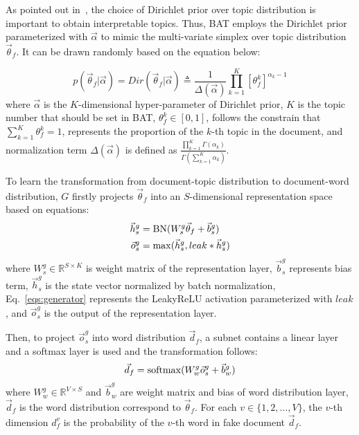\documentclass[11pt,a4paper]{article}
\begin{document}
As pointed out in~\cite{wallach2009rethinking}, the choice of Dirichlet prior over topic distribution is important to obtain interpretable topics. Thus, BAT employs the Dirichlet prior parameterized with $\vec \alpha$ to mimic the multi-variate simplex over topic distribution $\vec \theta_{f}$. It can be drawn randomly based on the equation below:
\begin{comment}
\begin{equation}
p(\vec \theta_{f}|\vec \alpha)=Dir(\vec \theta_{f}|\vec \alpha)\triangleq \frac{1}{\Delta(\vec \alpha)}\prod_{k=1}^{K}\left[\theta_{f}^{k}\right]^{\alpha_{k}-1}
\end{equation}
\end{comment}
\begin{equation}
p(\vec \theta_{f}|\vec \alpha)=Dir(\vec \theta_{f}|\vec \alpha)\triangleq \frac{1}{\Delta(\vec \alpha)}\prod_{k=1}^{K}\left[\theta_{f}^{k}\right]^{\alpha_{k}-1}
\end{equation}
where $\vec \alpha$ is the $K$-dimensional hyper-parameter of Dirichlet prior, $K$ is the topic number that should be set in BAT, $\theta_{f}^{k}\in \left[0,1\right]$, follows the constrain that $\sum_{k=1}^{K}\theta_{f}^{k}=1$, represents the proportion of the $k$-th topic in the document, and normalization term $\Delta(\vec \alpha)$ is defined as $\frac{\prod_{k=1}^{K}\Gamma(\alpha_{k})}{\Gamma(\sum_{k=1}^{K}\alpha_{k})}$.

To learn the transformation from document-topic distribution to document-word distribution, $G$ firstly projects $\vec \theta_{f}$ into an $S$-dimensional representation space based on equations:
\begin{align}
\vec h_{s}^{g}&={\rm BN}(W_{s}^{g}\vec \theta_{f}+\vec b_{s}^{g})\\
\vec o_{s}^{g}&=\max (\vec h_{s}^{g}, leak*\vec h_{s}^{g})\label{eqs:generator}
\end{align}
where $W_{s}^{g}\in \mathbb{R}^{S\times K}$ is weight matrix of the representation layer, $\vec b_{s}^{g}$ represents bias term, $\vec h_{s}^{g}$ is the state vector normalized by batch normalization, Eq.~\ref{eqs:generator} represents the LeakyReLU activation parameterized with $leak$, and $\vec o_{s}^{g}$ is the output of the representation layer.

{\color{black}Then, to project $\vec o_{s}^{g}$ into word distribution $\vec d_{f}$, a subnet contains a linear layer and a softmax layer is used and the transformation follows:
\begin{equation}
\vec d_{f}={\rm softmax}(W_{w}^{g}\vec o_{s}^{g}+\vec b_{w}^{g})\\
\end{equation}
where $W_{w}^{g}\in \mathbb{R}^{V\times S}$ and $\vec b_{w}^{g}$ are weight matrix and bias of word distribution layer, $\vec d_{f}$ is the word distribution correspond to $\vec \theta_{f}$. For each $v\in\{1,2,...,V\}$, the $v$-th dimension $d_{f}^{v}$ is the probability of the $v$-th word in fake document $\vec d_{f}$.
}
\end{document}
